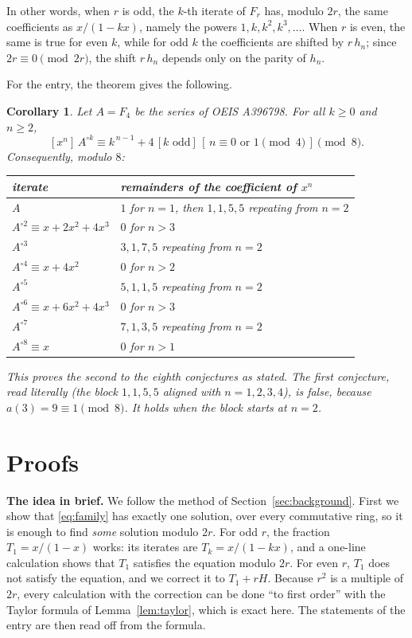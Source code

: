 \documentclass[11pt,a4paper]{article}
\newtheorem{corollary}[theorem]{Corollary}
\theoremstyle{definition}
\theoremstyle{remark}
\newcommand{\coeff}[2]{[x^{#1}]\,#2}
\newcommand{\para}[1]{\par\medskip\noindent\textbf{#1}\enspace}
\begin{document}
In other words, when $r$ is odd, the $k$-th iterate of $F_r$ has, modulo $2r$, the same coefficients as $x/(1-kx)$,
namely the powers $1,k,k^2,k^3,\dots$. When $r$ is even, the same is true for even $k$, while for odd $k$ the
coefficients are shifted by $r\,h_n$; since $2r\equiv0\pmod{2r}$, the shift $r\,h_n$ depends only on the parity of
$h_n$.

For the entry, the theorem gives the following.

\begin{corollary}\label{cor:app}
Let $A=F_4$ be the series of OEIS A396798. For all $k\ge0$ and $n\ge2$,
\[
\coeff{n}{A^{\circ k}}\equiv k^{\,n-1}+4\,[k\text{ odd}]\,[\,n\equiv0\text{ or }1\!\!\pmod4\,]\pmod8 .
\]
Consequently, modulo $8$:
\begin{center}\small\upshape\renewcommand{\arraystretch}{1.15}
\begin{tabular}{ll}
\toprule
iterate & remainders of the coefficient of $x^n$\\
\midrule
$A$ & $1$ for $n=1$, then $1,1,5,5$ repeating from $n=2$\\
$A^{\circ2}\equiv x+2x^2+4x^3$ & $0$ for $n>3$\\
$A^{\circ3}$ & $3,1,7,5$ repeating from $n=2$\\
$A^{\circ4}\equiv x+4x^2$ & $0$ for $n>2$\\
$A^{\circ5}$ & $5,1,1,5$ repeating from $n=2$\\
$A^{\circ6}\equiv x+6x^2+4x^3$ & $0$ for $n>3$\\
$A^{\circ7}$ & $7,1,3,5$ repeating from $n=2$\\
$A^{\circ8}\equiv x$ & $0$ for $n>1$\\
\bottomrule
\end{tabular}
\end{center}
This proves the second to the eighth conjectures as stated. The first conjecture, read literally (the block
$1,1,5,5$ aligned with $n=1,2,3,4$), is false, because $a(3)=9\equiv1\pmod8$. It holds when the block starts at $n=2$.
\end{corollary}

\section{Proofs}\label{sec:proofs}

\para{The idea in brief.} We follow the method of Section~\ref{sec:background}. First we show that
\eqref{eq:family} has exactly one solution, over every commutative ring, so it is enough to find \emph{some} solution
modulo $2r$. For odd $r$, the fraction $T_1=x/(1-x)$ works: its iterates are $T_k=x/(1-kx)$, and a one-line
calculation shows that $T_1$ satisfies the equation modulo $2r$. For even $r$, $T_1$ does not satisfy the equation, and we
correct it to $T_1+rH$. Because $r^2$ is a multiple of $2r$, every calculation with the correction can be done
``to first order'' with the Taylor formula of Lemma~\ref{lem:taylor}, which is exact here. The statements of the entry
are then read off from the formula.
\end{document}

